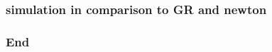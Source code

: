 \documentclass[18pt]{beamer}
\begin{document}
\begin{frame}
    \frametitle{simulation in comparison to GR and newton}
\begin{itemize}

\end{itemize}
\end{frame}


\begin{frame}
    \frametitle{next steps:}}
\begin{itemize}

\end{itemize}
\end{frame}



\begin{frame}
    \frametitle{looking forward}}
\begin{itemize}

\end{itemize}
\end{frame}










    \begin{frame}
        \frametitle{End}
        \end{frame}
\end{document}
